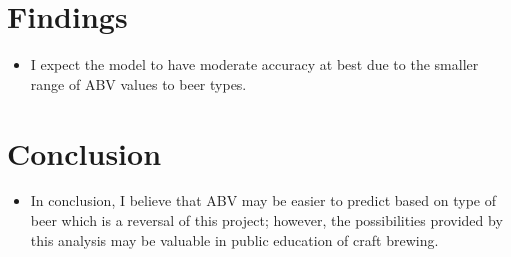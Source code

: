 \documentclass{article}
\begin{document}
\section{Findings}
\begin{itemize}
    \item I expect the model to have moderate accuracy at best due to 
the smaller range of ABV values to beer types.
\end{itemize}

\section{Conclusion}
\begin{itemize}
    \item In conclusion, I believe that ABV may be easier to predict 
based on type of beer which is a reversal of this project; however, the 
possibilities provided by this analysis may be valuable in public 
education of craft brewing.
\end{itemize}


\nocite{*}

\end{document}
